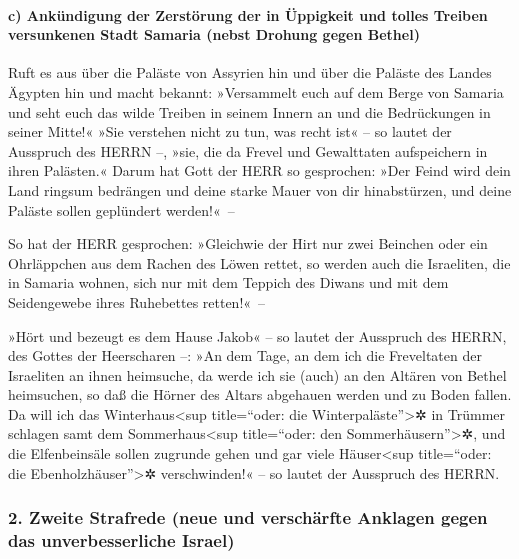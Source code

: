 \hypertarget{c-ankuxfcndigung-der-zerstuxf6rung-der-in-uxfcppigkeit-und-tolles-treiben-versunkenen-stadt-samaria-nebst-drohung-gegen-bethel}{%
\paragraph{c) Ankündigung der Zerstörung der in Üppigkeit und tolles
Treiben versunkenen Stadt Samaria (nebst Drohung gegen
Bethel)}\label{c-ankuxfcndigung-der-zerstuxf6rung-der-in-uxfcppigkeit-und-tolles-treiben-versunkenen-stadt-samaria-nebst-drohung-gegen-bethel}}

Ruft es aus über die Paläste von Assyrien hin und über die
Paläste des Landes Ägypten hin und macht bekannt: »Versammelt euch auf
dem Berge von Samaria und seht euch das wilde Treiben in seinem Innern
an und die Bedrückungen in seiner Mitte!« »Sie verstehen
nicht zu tun, was recht ist« -- so lautet der Ausspruch des HERRN --,
»sie, die da Frevel und Gewalttaten aufspeichern in ihren Palästen.«
Darum hat Gott der HERR so gesprochen: »Der Feind wird
dein Land ringsum bedrängen und deine starke Mauer von dir hinabstürzen,
und deine Paläste sollen geplündert werden!«~--

So hat der HERR gesprochen: »Gleichwie der Hirt nur zwei
Beinchen oder ein Ohrläppchen aus dem Rachen des Löwen rettet, so werden
auch die Israeliten, die in Samaria wohnen, sich nur mit dem Teppich des
Diwans und mit dem Seidengewebe ihres Ruhebettes retten!«~--

»Hört und bezeugt es dem Hause Jakob« -- so lautet der
Ausspruch des HERRN, des Gottes der Heerscharen --: »An
dem Tage, an dem ich die Freveltaten der Israeliten an ihnen heimsuche,
da werde ich sie (auch) an den Altären von Bethel heimsuchen, so daß die
Hörner des Altars abgehauen werden und zu Boden fallen.
Da will ich das Winterhaus\textless sup title=``oder: die
Winterpaläste''\textgreater✲ in Trümmer schlagen samt dem
Sommerhaus\textless sup title=``oder: den Sommerhäusern''\textgreater✲,
und die Elfenbeinsäle sollen zugrunde gehen und gar viele
Häuser\textless sup title=``oder: die Ebenholzhäuser''\textgreater✲
verschwinden!« -- so lautet der Ausspruch des HERRN.

\hypertarget{zweite-strafrede-neue-und-verschuxe4rfte-anklagen-gegen-das-unverbesserliche-israel}{%
\subsubsection{2. Zweite Strafrede (neue und verschärfte Anklagen gegen
das unverbesserliche
Israel)}\label{zweite-strafrede-neue-und-verschuxe4rfte-anklagen-gegen-das-unverbesserliche-israel}}


